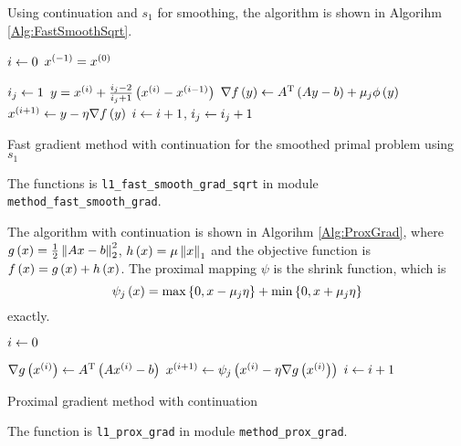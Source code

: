 \documentclass[english]{pkupaper}
\begin{document}
\begin{thmquestion}[3 (d)]
Using continuation and $s_1$ for smoothing, the algorithm is shown in Algorihm \ref{Alg:FastSmoothSqrt}.

\begin{algorithm}
\SetAlgoLined


$ i \leftarrow 0 $\;
$ x^{\left( -1 \right)} = x^{\left( 0 \right)} $\;

{
	$ i_j \leftarrow 1 $\;
	{
		$ y = x^{\left( i \right)} + \frac{ i_j - 2 }{ i_j + 1 } \left(  x^{\left( i \right)} - x^{\left(  i - 1  \right)}  \right) $\;
		$ \nabla f \left( y \right) \leftarrow A^{\mathrm{T}} \left(  A y - b  \right) + \mu_j \phi \left( y \right) $\;
		$ x^{\left(  i + 1  \right)} \leftarrow y - \eta \nabla f \left( y \right) $\;
		$ i \leftarrow i + 1 $, $ i_j \leftarrow i_j + 1 $\;
	}
}

\caption{Fast gradient method with continuation for the smoothed primal problem using $s_1$} \label{Alg:FastSmoothSqrt}
\end{algorithm}

The functions is \verb"l1_fast_smooth_grad_sqrt" in module \verb"method_fast_smooth_grad".
\end{thmquestion}

\begin{thmquestion}[3 (e)]
The algorithm with continuation is shown in Algorihm \ref{Alg:ProxGrad}, where $ g \left( x \right) = \frac{1}{2} \left\|  A x - b  \right\|_2^2 $, $ h \left( x \right) = \mu \left\| x \right\|_1 $ and the objective function is $ f \left( x \right) = g \left( x \right) + h \left( x \right) $. The proximal mapping $\psi$ is the shrink function, which is
\begin{equation}
\psi_j \left( x \right) = \max \left\{  0, x - \mu_j \eta  \right\} + \min \left\{  0, x + \mu_j \eta  \right\}
\end{equation}
exactly.

\begin{algorithm}
\SetAlgoLined


$ i \leftarrow 0 $\;

{
	{
		$ \nabla g \left( x^{\left( i \right)} \right) \leftarrow A^{\mathrm{T}} \left(  A x^{\left( i \right)} - b  \right) $\;
		$ x^{\left(  i + 1  \right)} \leftarrow \psi_j \left(  x^{\left( i \right)} - \eta \nabla g \left( x^{\left( i \right)} \right)  \right) $\;
		$ i \leftarrow i + 1 $\;
	}
}

\caption{Proximal gradient method with continuation} \label{Alg:ProxGrad}
\end{algorithm}

The function is \verb"l1_prox_grad" in module \verb"method_prox_grad".
\end{thmquestion}
\end{document}
